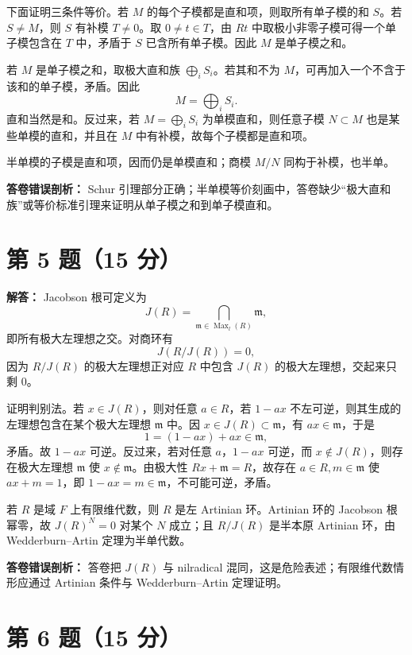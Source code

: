 \documentclass[11pt]{article}
\begin{document}
下面证明三条件等价。若 \(M\) 的每个子模都是直和项，则取所有单子模的和 \(S\)。若 \(S\neq M\)，则 \(S\) 有补模 \(T\neq0\)。取 \(0\neq t\in T\)，由 \(Rt\) 中取极小非零子模可得一个单子模包含在 \(T\) 中，矛盾于 \(S\) 已含所有单子模。因此 \(M\) 是单子模之和。

若 \(M\) 是单子模之和，取极大直和族 \(\bigoplus_i S_i\)。若其和不为 \(M\)，可再加入一个不含于该和的单子模，矛盾。因此
\[
  M=\bigoplus_i S_i.
\]
直和当然是和。反过来，若 \(M=\bigoplus_i S_i\) 为单模直和，则任意子模 \(N\subset M\) 也是某些单模的直和，并且在 \(M\) 中有补模，故每个子模都是直和项。

半单模的子模是直和项，因而仍是单模直和；商模 \(M/N\) 同构于补模，也半单。

\textbf{答卷错误剖析：}
Schur 引理部分正确；半单模等价刻画中，答卷缺少“极大直和族”或等价标准引理来证明从单子模之和到单子模直和。

\section*{第 5 题（15 分）}

\textbf{解答：}
Jacobson 根可定义为
\[
  J(R)=\bigcap_{\mathfrak m\in\operatorname{Max}_l(R)}\mathfrak m,
\]
即所有极大左理想之交。对商环有
\[
  J(R/J(R))=0,
\]
因为 \(R/J(R)\) 的极大左理想正对应 \(R\) 中包含 \(J(R)\) 的极大左理想，交起来只剩 \(0\)。

证明判别法。若 \(x\in J(R)\)，则对任意 \(a\in R\)，若 \(1-ax\) 不左可逆，则其生成的左理想包含在某个极大左理想 \(\mathfrak m\) 中。因 \(x\in J(R)\subset\mathfrak m\)，有 \(ax\in\mathfrak m\)，于是
\[
  1=(1-ax)+ax\in\mathfrak m,
\]
矛盾。故 \(1-ax\) 可逆。反过来，若对任意 \(a\)，\(1-ax\) 可逆，而 \(x\notin J(R)\)，则存在极大左理想 \(\mathfrak m\) 使 \(x\notin\mathfrak m\)。由极大性 \(Rx+\mathfrak m=R\)，故存在 \(a\in R,m\in\mathfrak m\) 使 \(ax+m=1\)，即 \(1-ax=m\in\mathfrak m\)，不可能可逆，矛盾。

若 \(R\) 是域 \(F\) 上有限维代数，则 \(R\) 是左 Artinian 环。Artinian 环的 Jacobson 根幂零，故 \(J(R)^N=0\) 对某个 \(N\) 成立；且 \(R/J(R)\) 是半本原 Artinian 环，由 Wedderburn--Artin 定理为半单代数。

\textbf{答卷错误剖析：}
答卷把 \(J(R)\) 与 nilradical 混同，这是危险表述；有限维代数情形应通过 Artinian 条件与 Wedderburn--Artin 定理证明。

\section*{第 6 题（15 分）}
\end{document}
